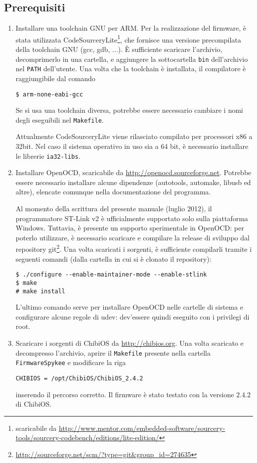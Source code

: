 \subsection*{Prerequisiti}
\begin{enumerate}
\item Installare una toolchain GNU per ARM. Per la realizzazione del firmware, è stata utilizzata  CodeSourceryLite\footnote{scaricabile da \url{http://www.mentor.com/embedded-software/sourcery-tools/sourcery-codebench/editions/lite-edition/}}, che fornisce una versione precompilata della toolchain GNU (gcc, gdb, ...). È sufficiente scaricare l'archivio, decomprimerlo in una cartella, e aggiungere la sottocartella \verb|bin| dell'archivio nel \verb|PATH| dell’utente. Una volta che la toolchain è installata, il compilatore è raggiungibile dal comando 
\begin{verbatim}
$ arm-none-eabi-gcc
\end{verbatim}
Se si usa una toolchain diversa, potrebbe essere necessario cambiare i nomi degli eseguibili nel \verb|Makefile|.

\begin{nota}
Attualmente CodeSourceryLite viene rilasciato compilato per processori x86 a 32bit. Nel caso il sistema operativo in uso sia a 64 bit, è necessario installare le librerie \verb|ia32-libs|.
\end{nota}

\item Installare OpenOCD, scaricabile da \url{http://openocd.sourceforge.net}. Potrebbe essere necessario installare alcune dipendenze (autotools, automake, libusb ed altre), elencate comunque nella documentazione del programma.

\begin{nota}
Al momento della scrittura del presente manuale (luglio 2012), il programmatore ST-Link v2 è ufficialmente supportato solo sulla piattaforma Windows. Tuttavia, è presente un supporto sperimentale in OpenOCD: per poterlo utilizzare, è necessario scaricare e compilare la release di sviluppo dal repository git\footnote{\url{http://sourceforge.net/scm/?type=git&group_id=274635}}. Una volta scaricati i sorgenti, è sufficiente compilarli tramite i seguenti comandi  (dalla cartella in cui si è clonato il repository):
\begin{verbatim}
$ ./configure --enable-maintainer-mode --enable-stlink
$ make
# make install
\end{verbatim}
L'ultimo comando serve per installare OpenOCD nelle cartelle di sistema e configurare alcune regole di udev: dev'essere quindi eseguito con i privilegi di root.
\end{nota}

\item Scaricare i sorgenti di ChibiOS da \url{http://chibios.org}. Una volta scaricato e decompresso l'archivio, aprire il \verb|Makefile| presente nella cartella \verb|FirmwareSpykee| e modificare la riga
\begin{verbatim}
CHIBIOS = /opt/ChibiOS/ChibiOS_2.4.2
\end{verbatim}
inserendo il percorso corretto. Il firmware è stato testato con la versione 2.4.2 di ChibiOS.
\end{enumerate}

